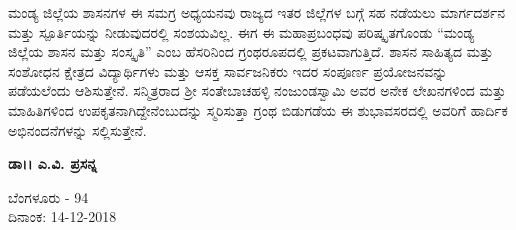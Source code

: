 ಮಂಡ್ಯ ಜಿಲ್ಲೆಯ ಶಾಸನಗಳ ಈ ಸಮಗ್ರ ಅಧ್ಯಯನವು ರಾಜ್ಯದ ಇತರ ಜಿಲ್ಲೆಗಳ ಬಗ್ಗೆ ಸಹ ನಡೆಯಲು ಮಾರ್ಗದರ್ಶನ ಮತ್ತು ಸ್ಪೂರ್ತಿಯನ್ನು ನೀಡುವುದರಲ್ಲಿ ಸಂಶಯವಿಲ್ಲ. ಈಗ ಈ ಮಹಾಪ್ರಬಂಧವು ಪರಿಷ್ಕೃತಗೊಂಡು “ಮಂಡ್ಯ ಜಿಲ್ಲೆಯ ಶಾಸನ ಮತ್ತು ಸಂಸ್ಕೃತಿ” ಎಂಬ ಹೆಸರಿನಿಂದ ಗ್ರಂಥರೂಪದಲ್ಲಿ ಪ್ರಕಟವಾಗುತ್ತಿದೆ. ಶಾಸನ ಸಾಹಿತ್ಯದ ಮತ್ತು ಸಂಶೋಧನ ಕ್ಷೇತ್ರದ ವಿದ್ಯಾರ್ಥಿಗಳು ಮತ್ತು ಆಸಕ್ತ ಸಾರ್ವಜನಿಕರು ಇದರ ಸಂಪೂರ್ಣ ಪ್ರಯೋಜನವನ್ನು ಪಡೆಯಲೆಂದು ಆಶಿಸುತ್ತೇನೆ. ಸನ್ಮಿತ್ರರಾದ ಶ‍್ರೀ ಸಂತೇಬಾಚಹಳ್ಳಿ ನಂಜುಂಡಸ್ವಾಮಿ ಅವರ ಅನೇಕ ಲೇಖನಗಳಿಂದ ಮತ್ತು ಮಾಹಿತಿಗಳಿಂದ ಉಪಕೃತನಾಗಿದ್ದೇನೆಂಬುದನ್ನು ಸ್ಮರಿಸುತ್ತಾ ಗ್ರಂಥ ಬಿಡುಗಡೆಯ ಈ ಶುಭಾವಸರದಲ್ಲಿ ಅವರಿಗೆ ಹಾರ್ದಿಕ ಅಭಿನಂದನೆಗಳನ್ನು ಸಲ್ಲಿಸುತ್ತೇನೆ.

\begin{flushright}
\textbf{ಡಾ।। ಎ.ವಿ. ಪ್ರಸನ್ನ}
\end{flushright}

\noindent
ಬೆಂಗಳೂರು - 94\\ ದಿನಾಂಕ: 14-12-2018

